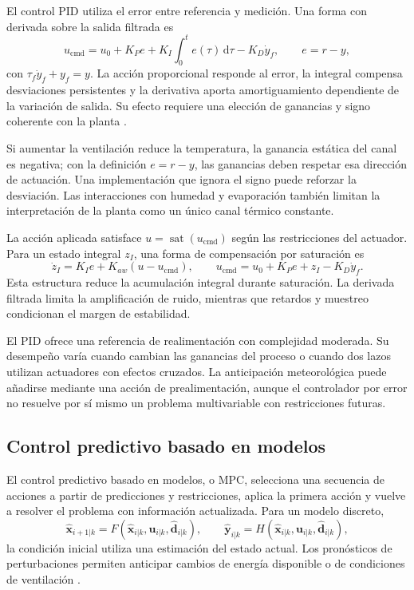 El control PID utiliza el error entre referencia y medición. Una forma con derivada sobre la salida filtrada es
\begin{equation}
u_{\mathrm{cmd}}=u_0+K_Pe+K_I\int_0^te(\tau)\,\mathrm{d}\tau
-K_D\dot y_f,
\qquad
e=r-y,
\label{eq:control_pid}
\end{equation}
con $\tau_f\dot y_f+y_f=y$. La acción proporcional responde al error, la integral compensa desviaciones persistentes y la derivativa aporta amortiguamiento dependiente de la variación de salida. Su efecto requiere una elección de ganancias y signo coherente con la planta \cite{astrom2008}.

Si aumentar la ventilación reduce la temperatura, la ganancia estática del canal es negativa; con la definición $e=r-y$, las ganancias deben respetar esa dirección de actuación. Una implementación que ignora el signo puede reforzar la desviación. Las interacciones con humedad y evaporación también limitan la interpretación de la planta como un único canal térmico constante.

La acción aplicada satisface $u=\operatorname{sat}(u_{\mathrm{cmd}})$ según las restricciones del actuador. Para un estado integral $z_I$, una forma de compensación por saturación es
\begin{equation}
\dot z_I=K_Ie+K_{aw}(u-u_{\mathrm{cmd}}),
\qquad
u_{\mathrm{cmd}}=u_0+K_Pe+z_I-K_D\dot y_f.
\label{eq:antiwindup}
\end{equation}
Esta estructura reduce la acumulación integral durante saturación. La derivada filtrada limita la amplificación de ruido, mientras que retardos y muestreo condicionan el margen de estabilidad.

El PID ofrece una referencia de realimentación con complejidad moderada. Su desempeño varía cuando cambian las ganancias del proceso o cuando dos lazos utilizan actuadores con efectos cruzados. La anticipación meteorológica puede añadirse mediante una acción de prealimentación, aunque el controlador por error no resuelve por sí mismo un problema multivariable con restricciones futuras.

\subsection{Control predictivo basado en modelos}
\label{subsec:control_predictivo}

El control predictivo basado en modelos, o MPC, selecciona una secuencia de acciones a partir de predicciones y restricciones, aplica la primera acción y vuelve a resolver el problema con información actualizada. Para un modelo discreto,
\begin{equation}
\widehat{\mathbf x}_{i+1|k}
=F(\widehat{\mathbf x}_{i|k},\mathbf u_{i|k},\widehat{\mathbf d}_{i|k}),
\qquad
\widehat{\mathbf y}_{i|k}=H(\widehat{\mathbf x}_{i|k},\mathbf u_{i|k},\widehat{\mathbf d}_{i|k}),
\label{eq:modelo_estado_mpc}
\end{equation}
la condición inicial utiliza una estimación del estado actual. Los pronósticos de perturbaciones permiten anticipar cambios de energía disponible o de condiciones de ventilación \cite{rawlings2017}.

